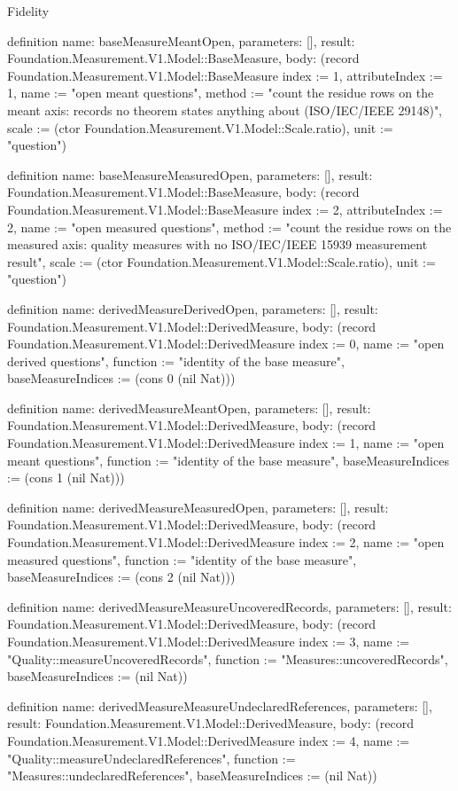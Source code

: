 \begin{lexlean}{Fidelity}
\begin{semanticmodule}
definition{
  name: baseMeasureMeantOpen,
  parameters: [],
  result: Foundation.Measurement.V1.Model::BaseMeasure,
  body: (record Foundation.Measurement.V1.Model::BaseMeasure {index := 1, attributeIndex := 1, name := "open meant questions", method := "count the residue rows on the meant axis: records no theorem states anything about (ISO/IEC/IEEE 29148)", scale := (ctor Foundation.Measurement.V1.Model::Scale.ratio), unit := "question"})
}

definition{
  name: baseMeasureMeasuredOpen,
  parameters: [],
  result: Foundation.Measurement.V1.Model::BaseMeasure,
  body: (record Foundation.Measurement.V1.Model::BaseMeasure {index := 2, attributeIndex := 2, name := "open measured questions", method := "count the residue rows on the measured axis: quality measures with no ISO/IEC/IEEE 15939 measurement result", scale := (ctor Foundation.Measurement.V1.Model::Scale.ratio), unit := "question"})
}

definition{
  name: derivedMeasureDerivedOpen,
  parameters: [],
  result: Foundation.Measurement.V1.Model::DerivedMeasure,
  body: (record Foundation.Measurement.V1.Model::DerivedMeasure {index := 0, name := "open derived questions", function := "identity of the base measure", baseMeasureIndices := (cons 0 (nil Nat))})
}

definition{
  name: derivedMeasureMeantOpen,
  parameters: [],
  result: Foundation.Measurement.V1.Model::DerivedMeasure,
  body: (record Foundation.Measurement.V1.Model::DerivedMeasure {index := 1, name := "open meant questions", function := "identity of the base measure", baseMeasureIndices := (cons 1 (nil Nat))})
}

definition{
  name: derivedMeasureMeasuredOpen,
  parameters: [],
  result: Foundation.Measurement.V1.Model::DerivedMeasure,
  body: (record Foundation.Measurement.V1.Model::DerivedMeasure {index := 2, name := "open measured questions", function := "identity of the base measure", baseMeasureIndices := (cons 2 (nil Nat))})
}

definition{
  name: derivedMeasureMeasureUncoveredRecords,
  parameters: [],
  result: Foundation.Measurement.V1.Model::DerivedMeasure,
  body: (record Foundation.Measurement.V1.Model::DerivedMeasure {index := 3, name := "Quality::measureUncoveredRecords", function := "Measures::uncoveredRecords", baseMeasureIndices := (nil Nat)})
}

definition{
  name: derivedMeasureMeasureUndeclaredReferences,
  parameters: [],
  result: Foundation.Measurement.V1.Model::DerivedMeasure,
  body: (record Foundation.Measurement.V1.Model::DerivedMeasure {index := 4, name := "Quality::measureUndeclaredReferences", function := "Measures::undeclaredReferences", baseMeasureIndices := (nil Nat)})
}


\end{semanticmodule}
\end{lexlean}
